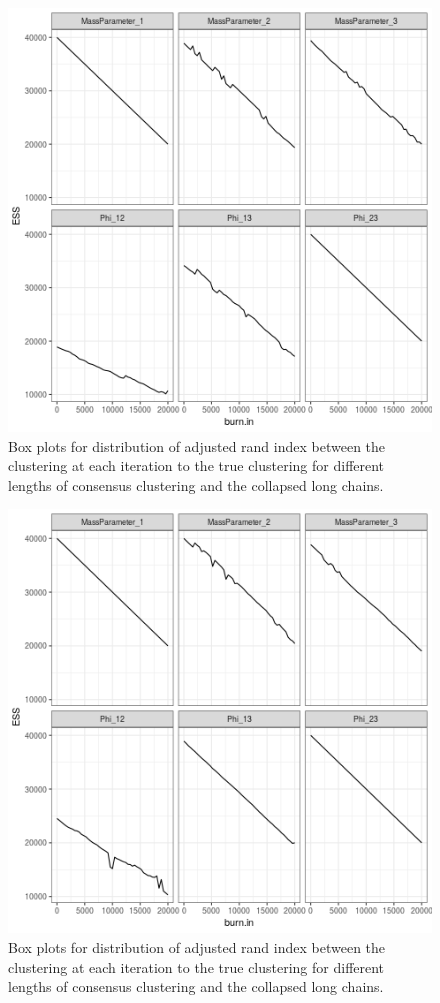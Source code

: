 \documentclass[12pt]{article} %
\begin{document}
\begin{figure}[h]
	\centering
	\includegraphics[scale=0.65]{Images/Gen_data/Case_1/Esimated_burn_in_plot_2.png}
	\caption{Box plots for distribution of adjusted rand index between the clustering at each iteration to the true clustering for different lengths of consensus clustering and the collapsed long chains.}
	\label{fig:case_1_esimated_burn_in_plot_2}
\end{figure}

\newpage

\begin{figure}[h]
	\centering
	\includegraphics[scale=0.65]{Images/Gen_data/Case_1/Esimated_burn_in_plot_3.png}
	\caption{Box plots for distribution of adjusted rand index between the clustering at each iteration to the true clustering for different lengths of consensus clustering and the collapsed long chains.}
	\label{fig:case_1_esimated_burn_in_plot_3}
\end{figure}
\end{document}
